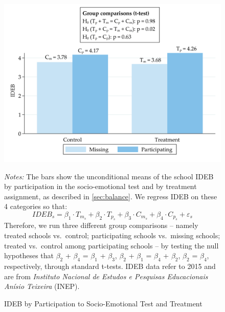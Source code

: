 \documentclass[11pt,a4paper]{article}
\begin{document}
\begin{figure}[htbp]
    \caption{IDEB by Participation to Socio-Emotional Test and Treatment}
    \label{fig:predict_participation}
    \centering

    \includegraphics[width=14cm]{DataWork/Output/Figures/figA5_predict_participation.png}
    
    \noindent
    \justifying
    \small{\textit{Notes:} The bars show the unconditional means of the school IDEB by participation in the socio-emotional test and by treatment assignment, as described in \ref{sec:balance}. We regress IDEB on these 4 categories so that:
    \begin{equation*}
        IDEB_s = \beta_1 \cdot T_{m_s} + \beta_2 \cdot T_{p_s} + \beta_3 \cdot C_{m_s} + \beta_4 \cdot C_{p_s} + \varepsilon_s
    \end{equation*}
    Therefore, we run three different group comparisons -- namely treated schools vs.\ control; participating schools vs.\ missing schools; treated vs.\ control among participating schools -- by testing the null hypotheses that $\beta_2$ + $\beta_4$ = $\beta_1$ + $\beta_3$, $\beta_2$ + $\beta_1$ = $\beta_4$ + $\beta_2$, $\beta_2$ = $\beta_4$, respectively, through standard t-tests. IDEB data refer to 2015 and are from \textit{Instituto Nacional de Estudos e Pesquisas Educacionais Anísio Teixeira} (INEP).}
\end{figure}
\end{document}
